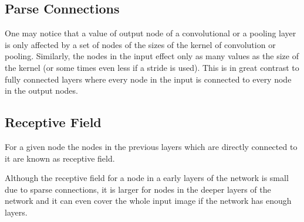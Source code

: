 \documentclass[]{article}
\begin{document}


\subsection{Parse Connections}
One may notice that a value of output node of a convolutional or a pooling layer
is only affected by a set of nodes of the sizes of the kernel of convolution or
pooling. Similarly, the nodes in the input effect only as many values as the size
of the kernel (or some times even less if a stride is used). This is in great contrast
to fully connected layers where every node in the input is connected to every node
in the output nodes.


\subsection{Receptive Field}
For a given node the nodes in the previous layers which are directly connected
to it are known as receptive field.

Although the receptive field for a node in a early layers of the network is small
due to sparse connections, it is larger for nodes in the deeper layers of the network
and it can even cover the whole input image if the network has enough layers.
\end{document}
